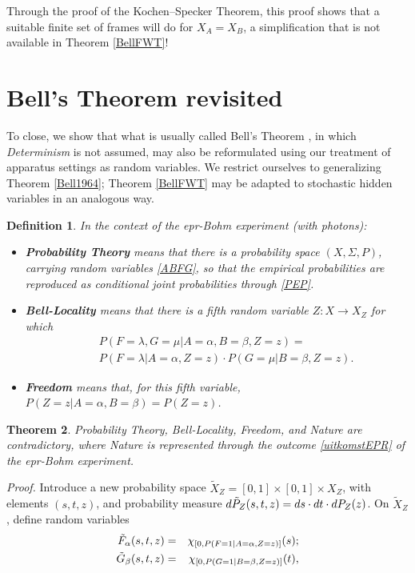 \documentclass[11pt]{article}
\newtheorem{Definition}{Definition}[section]
\newtheorem{Theorem}[Definition]{Theorem}
\newcommand{\epr}{{\sc epr}}
\newcommand{\raw}{\rightarrow} \newcommand{\rat}{\mapsto}
\newcommand{\x}{\times} \newcommand{\hb}{\hbar}
\newcommand{\er}{\eqref}
\newcommand{\al}{\alpha} \newcommand{\bt}{L\beta}
\newcommand{\lm}{\lambda} \newcommand{\Lm}{\Lambda}
\newcommand{\Sg}{\Sigma} \newcommand{\ta}{\tau} \newcommand{\ph}{\phi}
\begin{document}
\noindent Through the proof of the Kochen--Specker Theorem, this proof  shows that a suitable finite set of frames will do for $X_A=X_B$, a simplification that is not available in Theorem \ref{BellFWT}!
\section{Bell's  Theorem revisited} \label{BLTsec}
To close, we show that what is usually called Bell's Theorem \cite{Bell4,Bub,JB,Gill,Jaeger,Maudlin,Seevinck,WW}, in which \emph{Determinism} is not assumed, may also be reformulated using our  treatment of  apparatus settings as random variables.
We restrict ourselves to generalizing Theorem \ref{Bell1964};  Theorem \ref{BellFWT} may be adapted to stochastic hidden variables in an  analogous way.
\begin{Definition}\label{Bellnewdefs}
In the context of the  \epr-Bohm experiment (with photons):
\begin{itemize}
\item
\textbf{Probability Theory} means that there is a probability space $(X,\Sg,P)$, carrying random variables 
\er{ABFG}, so that the empirical  probabilities are reproduced as conditional joint probabilities through \er{PEP}.
\item \textbf{Bell-Locality}  means that there is a fifth random variable $Z:X\raw X_Z$ for which
\begin{eqnarray} && P(F=\lm,G=\mu|A=\al,B=\beta,Z=z)=  \\
&& P(F=\lm|A=\al,Z=z)\cdot P(G=\mu|B=\beta,Z=z).\label{BellL}
\end{eqnarray}
\item \textbf{Freedom} means that, for this fifth variable, $P(Z=z|A=\al,B=\beta)=P(Z=z)$.
\end{itemize}
\end{Definition}
\begin{Theorem}\label{Bell1976}
 Probability Theory,  Bell-Locality, Freedom, and Nature are contradictory, where Nature  is represented through the outcome \er{uitkomstEPR} of the \epr-Bohm experiment.
\end{Theorem}
\emph{Proof.} Introduce a new probability space $\tilde{X}_Z=[0,1]\x [0,1]\x X_Z$, with elements  $(s,t,z)$, and  probability measure $d\tilde{P}_Z(s,t,z)=ds\cdot dt\cdot dP_Z(z)$. On $\tilde{X}_Z$, define random variables
\begin{eqnarray}
\til{F}_{\al}(s,t,z)&=& \chi_{[0,P(F=1|A=\al,Z=z)]}(s);\\
\til{G}_{\beta}(s,t,z)&=& \chi_{[0,P(G=1|B=\beta,Z=z)]}(t),
\end{eqnarray}
\end{document}
